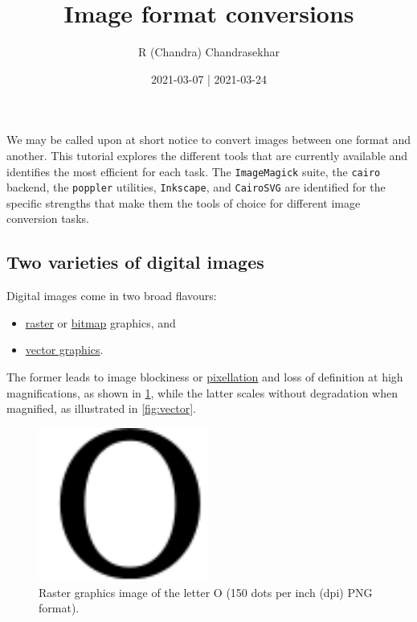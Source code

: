 \documentclass[
  11pt,
  british,
  a4paper,
]{article}
\title{Image format conversions}
\author{R (Chandra) Chandrasekhar}
\date{2021-03-07 | 2021-03-24}
\providecommand{\tightlist}{%
  \setlength{\itemsep}{0pt}\setlength{\parskip}{0pt}}
\begin{document}
\maketitle

\thispagestyle{empty}


We may be called upon at short notice to convert images between one
format and another. This tutorial explores the different tools that are
currently available and identifies the most efficient for each task. The
\texttt{ImageMagick} suite, the \texttt{cairo} backend, the
\texttt{poppler} utilities, \texttt{Inkscape}, and \texttt{CairoSVG} are
identified for the specific strengths that make them the tools of choice
for different image conversion tasks.

\hypertarget{two-varieties-of-digital-images}{%
\subsection{Two varieties of digital
images}\label{two-varieties-of-digital-images}}

Digital images come in two broad flavours:

\begin{itemize}
\tightlist
\item
  \href{https://en.wikipedia.org/wiki/Raster_graphics}{raster} or
  \href{https://en.wikipedia.org/wiki/Bitmap}{bitmap} graphics, and
\item
  \href{https://en.wikipedia.org/wiki/Vector_graphics}{vector graphics}.
\end{itemize}

The former leads to image blockiness or
\href{https://en.wikipedia.org/wiki/Pixelation}{pixellation} and loss of
definition at high magnifications, as shown in \cref{fig:raster}, while
the latter scales without degradation when magnified, as illustrated in
\cref{fig:vector}.

\begin{figure}
\hypertarget{fig:raster}{%
\centering
\includegraphics[width=0.5\textwidth,height=\textheight]{images/letter-O-150-dpi.png}
\caption{Raster graphics image of the letter O (150 dots per inch (dpi)
PNG format).}\label{fig:raster}
}
\end{figure}
\end{document}
